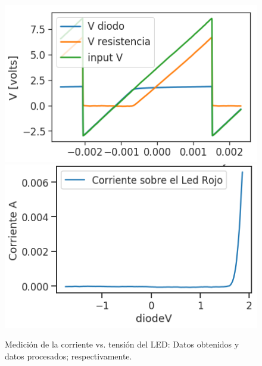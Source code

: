 \begin{figure}[H]
\centering
\includegraphics[scale=0.5]{../EJ1/LED/datosOsciloscopioLED}
\includegraphics[scale=0.5]{../EJ1/LED/LEDMedido}
\caption{Medici\'on de la corriente vs. tensi\'on del LED: Datos obtenidos y datos procesados; respectivamente.}
\label{med3b}
\end{figure}

